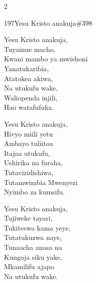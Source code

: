 \documentclass{article}
\begin{document}
\begin{multicols}{2}
\begin{hymn}{197}{Yesu Kristo anakuja}{\#398}
\begin{stanza}
Yesu Kristo anakuja,\\
Tuyainue macho,\\
Kwani mambo ya mwishoni\\
Yanatukaribia,\\
Atatokea akiwa,\\
Na utukufu wake,\\
Waliopenda injili,\\
Hao watafufuka.
\end{stanza}
\begin{stanza}
Yesu Kristo anakuja,\\
Hivyo miili yetu\\
Ambayo tuliitoa\\
Itajaa utukufu,\\
Ushirika na furaha,\\
Tutavizidishiwa,\\
Tutamwimbia Mwenyezi\\
Nyimbo za kumsifu.
\end{stanza}
\begin{stanza}
Yesu Kristo anakuja,\\
Tujiweke tayari,\\
Tukiteswa kama yeye,\\
Tutatukuzwa naye,\\
Tunaacha anasa na\\
Kungoja siku yake,\\
Mkamilifu ajapo\\
Na utukufu wake.
\end{stanza}
\end{hymn}


\end{multicols}
\end{document}
